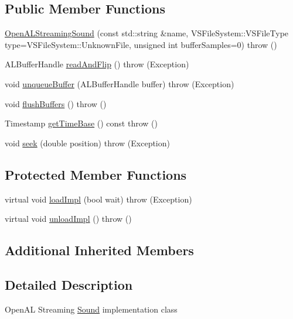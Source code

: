 \subsection*{Public Member Functions}
\begin{DoxyCompactItemize}
\item 
\hyperlink{classAudio_1_1OpenALStreamingSound_a33958fdf51c537c813adc50ff44a84ae}{Open\+A\+L\+Streaming\+Sound} (const std\+::string \&name, V\+S\+File\+System\+::\+V\+S\+File\+Type type=V\+S\+File\+System\+::\+Unknown\+File, unsigned int buffer\+Samples=0)  throw ()
\item 
A\+L\+Buffer\+Handle \hyperlink{classAudio_1_1OpenALStreamingSound_a14ebc3d2ad5412bf0ff44ebd0082f5f1}{read\+And\+Flip} ()  throw (\+Exception)
\item 
void \hyperlink{classAudio_1_1OpenALStreamingSound_a618fdc59cbbd807f53d4a91c65591470}{unqueue\+Buffer} (A\+L\+Buffer\+Handle buffer)  throw (\+Exception)
\item 
void \hyperlink{classAudio_1_1OpenALStreamingSound_a94b15fbaadc6fcd6ca8ba28717521d27}{flush\+Buffers} ()  throw ()
\item 
Timestamp \hyperlink{classAudio_1_1OpenALStreamingSound_a42543025d30ebff2be13ecde1e9c53ff}{get\+Time\+Base} () const   throw ()
\item 
void \hyperlink{classAudio_1_1OpenALStreamingSound_a12a989004d25224a6326828dd3cef0db}{seek} (double position)  throw (\+Exception)
\end{DoxyCompactItemize}
\subsection*{Protected Member Functions}
\begin{DoxyCompactItemize}
\item 
virtual void \hyperlink{classAudio_1_1OpenALStreamingSound_a3d4600e6d5c74d32954daa2267a46236}{load\+Impl} (bool wait)  throw (\+Exception)
\item 
virtual void \hyperlink{classAudio_1_1OpenALStreamingSound_a9dedea62e451a2587b86fef7b8488d55}{unload\+Impl} ()  throw ()
\end{DoxyCompactItemize}
\subsection*{Additional Inherited Members}


\subsection{Detailed Description}
Open\+AL Streaming \hyperlink{classAudio_1_1Sound}{Sound} implementation class

